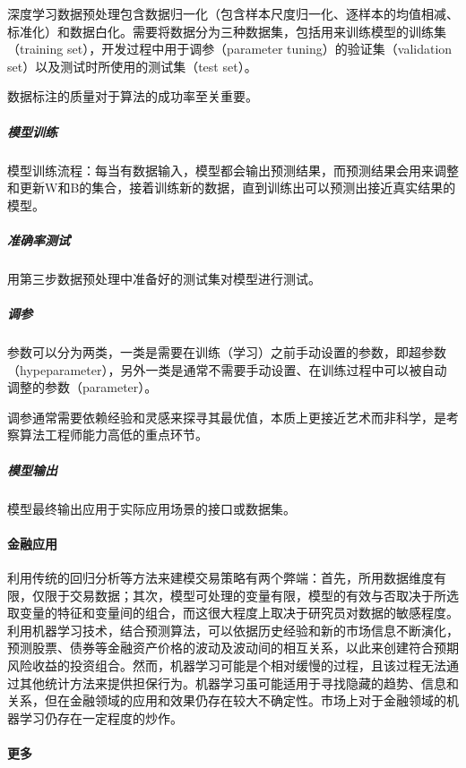 \documentclass[letterpaper,10pt,english]{sphinxmanual}
\begin{document}
深度学习数据预处理包含数据归一化（包含样本尺度归一化、逐样本的均值相减、标准化）和数据白化。需要将数据分为三种数据集，包括用来训练模型的训练集（training
set），开发过程中用于调参（parameter tuning）的验证集（validation
set）以及测试时所使用的测试集（test set）。

数据标注的质量对于算法的成功率至关重要。


\subparagraph{模型训练}
\label{\detokenize{chapter_AI_dive/ML:id15}}
模型训练流程：每当有数据输入，模型都会输出预测结果，而预测结果会用来调整和更新W和B的集合，接着训练新的数据，直到训练出可以预测出接近真实结果的模型。


\subparagraph{准确率测试}
\label{\detokenize{chapter_AI_dive/ML:id16}}
用第三步数据预处理中准备好的测试集对模型进行测试。


\subparagraph{调参}
\label{\detokenize{chapter_AI_dive/ML:id17}}
参数可以分为两类，一类是需要在训练（学习）之前手动设置的参数，即超参数（hypeparameter），另外一类是通常不需要手动设置、在训练过程中可以被自动调整的参数（parameter）。

调参通常需要依赖经验和灵感来探寻其最优值，本质上更接近艺术而非科学，是考察算法工程师能力高低的重点环节。


\subparagraph{模型输出}
\label{\detokenize{chapter_AI_dive/ML:id18}}
模型最终输出应用于实际应用场景的接口或数据集。


\paragraph{金融应用}
\label{\detokenize{chapter_AI_dive/ML:id19}}
利用传统的回归分析等方法来建模交易策略有两个弊端：首先，所用数据维度有限，仅限于交易数据；其次，模型可处理的变量有限，模型的有效与否取决于所选取变量的特征和变量间的组合，而这很大程度上取决于研究员对数据的敏感程度。利用机器学习技术，结合预测算法，可以依据历史经验和新的市场信息不断演化，预测股票、债券等金融资产价格的波动及波动间的相互关系，以此来创建符合预期风险收益的投资组合。然而，机器学习可能是个相对缓慢的过程，且该过程无法通过其他统计方法来提供担保行为。机器学习虽可能适用于寻找隐藏的趋势、信息和关系，但在金融领域的应用和效果仍存在较大不确定性。市场上对于金融领域的机器学习仍存在一定程度的炒作。%
\begin{footnote}[930]\sphinxAtStartFootnote
{}
%
\end{footnote}


\paragraph{更多}
\label{\detokenize{chapter_AI_dive/ML:id20}}
\end{document}
